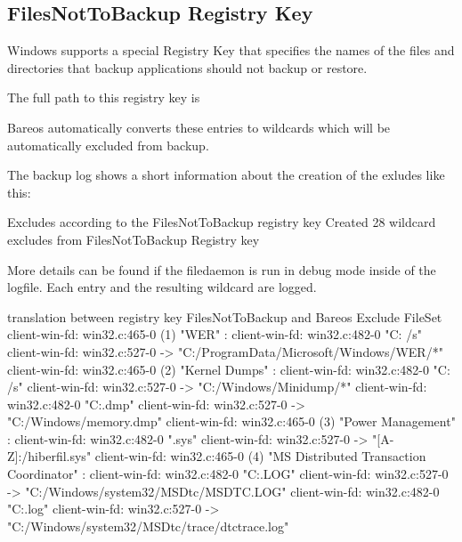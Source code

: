 \subsection{FilesNotToBackup Registry Key}
    \label{FilesNotToBackup}


Windows supports a special Registry Key that specifies the names of the files and directories that backup applications should not backup or restore.

The full path to this registry key is 

Bareos automatically converts these entries to wildcards which will be automatically excluded from backup.

The backup log shows a short information about the creation of the exludes like this:

\begin{bmessage}{Excludes according to the FilesNotToBackup registry key}
Created 28 wildcard excludes from FilesNotToBackup Registry key
\end{bmessage}

More details can be found if the filedaemon is run in debug mode inside of the  logfile. 
Each entry and the resulting wildcard are logged.

\begin{bmessage}{translation between registry key FilesNotToBackup and Bareos Exclude FileSet}
client-win-fd: win32.c:465-0 (1) "WER" :
client-win-fd: win32.c:482-0         "C:\ProgramData\Microsoft\Windows\WER\* /s"
client-win-fd: win32.c:527-0     ->  "C:/ProgramData/Microsoft/Windows/WER/*"
client-win-fd: win32.c:465-0 (2) "Kernel Dumps" :
client-win-fd: win32.c:482-0         "C:\Windows\Minidump\* /s"
client-win-fd: win32.c:527-0     ->  "C:/Windows/Minidump/*"
client-win-fd: win32.c:482-0         "C:\Windows\memory.dmp"
client-win-fd: win32.c:527-0     ->  "C:/Windows/memory.dmp"
client-win-fd: win32.c:465-0 (3) "Power Management" :
client-win-fd: win32.c:482-0         "\hiberfil.sys"
client-win-fd: win32.c:527-0     ->  "[A-Z]:/hiberfil.sys"
client-win-fd: win32.c:465-0 (4) "MS Distributed Transaction Coordinator" :
client-win-fd: win32.c:482-0         "C:\Windows{}\MSDtc\MSDTC.LOG"
client-win-fd: win32.c:527-0     ->  "C:/Windows/system32/MSDtc/MSDTC.LOG"
client-win-fd: win32.c:482-0         "C:\Windows{}\MSDtc\trace\dtctrace.log"
client-win-fd: win32.c:527-0     ->  "C:/Windows/system32/MSDtc/trace/dtctrace.log"
\end{bmessage}

